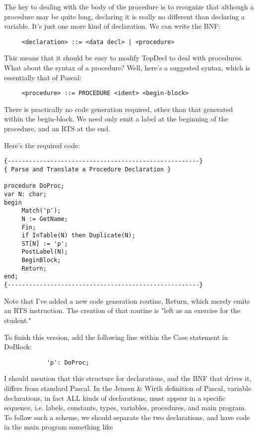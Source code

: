 The key to dealing with the body of the procedure is to recognize that  although a procedure may be quite  long, declaring  it  is really no different than  declaring  a  variable. It's just one more kind of declaration. We can write the BNF:

\begin{verbatim}
     <declaration> ::= <data decl> | <procedure>
\end{verbatim}

This means that it should be easy to modify TopDecl to  deal with procedures. What about the syntax of a procedure?   Well, here's a suggested syntax, which is essentially that of Pascal:

\begin{verbatim}
     <procedure> ::= PROCEDURE <ident> <begin-block>
\end{verbatim}

There is practically no code generation required, other than that generated within the begin-block. We need only emit a label at the beginning of the procedure, and an RTS at the end.

Here's the required code:

\begin{verbatim}
{------------------------------------------------------}
{ Parse and Translate a Procedure Declaration }

procedure DoProc;
var N: char;
begin
     Match('p');
     N := GetName;
     Fin;
     if InTable(N) then Duplicate(N);
     ST[N] := 'p';
     PostLabel(N);
     BeginBlock;
     Return;
end;
{------------------------------------------------------}
\end{verbatim}

Note that I've added a new code generation routine, Return, which merely emits an RTS instruction. The creation of that routine is "left as an exercise for the student."

To  finish  this  version, add the following line within the Case statement in DoBlock:

\begin{verbatim}
            'p': DoProc;
\end{verbatim}

I should mention that  this  structure  for declarations, and the BNF that drives it, differs from standard Pascal. In  the Jensen \& Wirth  definition of Pascal, variable declarations, in fact ALL kinds of declarations, must  appear in a specific sequence, i.e. labels, constants, types, variables, procedures, and   main program. To  follow  such  a  scheme, we should separate the two declarations, and have code in the main program something like

